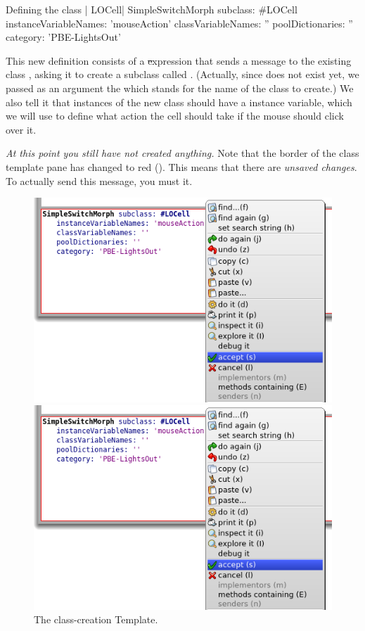\documentclass[a4paper,10pt,twoside]{book}
\begin{document}
\begin{classdef}[firstClassDef]{Defining the class \ct| LOCell|}
SimpleSwitchMorph subclass: #LOCell
   instanceVariableNames: 'mouseAction'
   classVariableNames: ''
   poolDictionaries: ''
   category: 'PBE-LightsOut'
\end{classdef}

This new definition consists of a \st expression that sends a message to the existing class , asking it to create a subclass called .
(Actually, since  does not exist yet, we passed as an argument the   which stands for the name of the class to create.)
We also tell it that instances of the new class should have a  instance variable, which we will use to define what action the cell should take if the mouse should click over it.

\emph{At this point you still have not created anything.}
Note that the border of the class template pane has changed to red ().
This means that there are \emph{unsaved changes}.
To actually send this message, you must  it.

\begin{figure}[h!t]
\ifluluelse
	{\centerline {\includegraphics[width=\textwidth]{AcceptClassDef}}}
	{\centerline {\includegraphics[scale=0.7]{AcceptClassDef}}}
\caption{The class-creation Template.
\label{fig:acceptClassDef}}
\end{figure}
\end{document}

